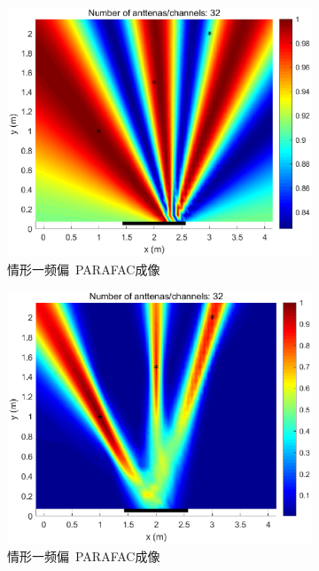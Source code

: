 \begin{figure}[H]
  \begin{subfigure}[t]{.3\linewidth}
    \centering
    \includegraphics[width=1\textwidth]{figures/compare/TPF_freq1.eps}
    \caption{情形一频偏~PARAFAC成像}
  \end{subfigure}
  \begin{subfigure}[t]{.3\linewidth}
    \centering
    \includegraphics[width=1\textwidth]{figures/compare/TPF_freq2.eps}
    \caption{情形一频偏~PARAFAC成像}
  \end{subfigure}
  \\
  \begin{subfigure}[t]{.3\linewidth}

\end{subfigure}
\end{figure}
